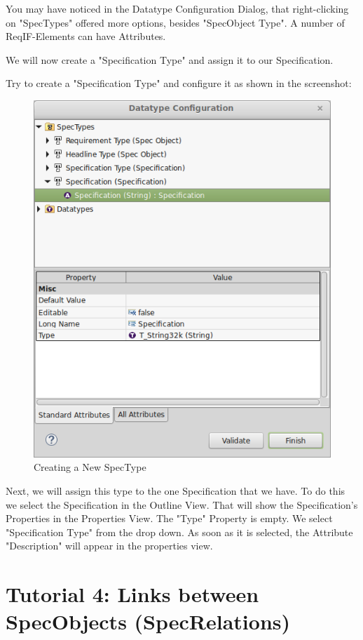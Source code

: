 You may have noticed in the Datatype Configuration Dialog, that right-clicking on "SpecTypes" offered more options, besides "SpecObject Type".  A number of ReqIF-Elements can have Attributes.

We will now create a "Specification Type" and assign it to our Specification.

Try to create a "Specification Type" and configure it as shown in the screenshot:

\begin{figure}[h!]
\centering      
\includegraphics[width=0.8\linewidth]{../rmf-images/new_spectype.png}      
\caption{Creating a New SpecType}      
\label{fig:newSpecType}
\end{figure}

Next, we will assign this type to the one Specification that we have.  To do this we select the Specification in the Outline View.  That will show
the Specification's Properties in the Properties View.  The "Type" Property is empty.  We select "Specification Type" from the drop down.
As soon as it is selected, the Attribute "Description" will appear in the properties view.

\section{Tutorial 4: Links between SpecObjects (SpecRelations)}

